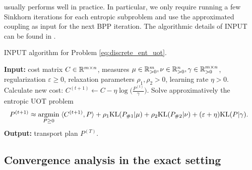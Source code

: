 usually performs well in practice. In particular,
we only require running a few Sinkhorn iterations for each entropic subproblem and
use the approximated coupling as input for the next BPP iteration.
The algorithmic details of INPUT can be found in .
\begin{algorithm}[t]
  \caption{INPUT algorithm for Problem \ref{eq:discrete_ent_uot}.}
  \label{alg:isppa}
\begin{algorithmic}[1]
  \STATE \textbf{Input:} cost matrix $C \in \mathbb R^{m \times n}$,
  measures $\mu \in \mathbb R^m_{> 0}, \nu \in \mathbb R^n_{> 0}, \gamma \in \mathbb R^{m \times n}_{> 0}$,
  regularization $\varepsilon \geq 0$, relaxation parameters $\rho_1, \rho_2 > 0$,
  learning rate $\eta > 0$.
  \STATE Calculate new cost: $C^{(t+1)} \gets C - \eta \log \Big( \frac{P^{(t)}}{\gamma} \Big)$.
  \STATE Solve approximatively the entropic UOT problem
  \begin{align*}
    P^{(t+1)} \approx \operatorname*{argmin}_{P \geq 0} \; \langle C^{(t+1)}, P \rangle +
    \rho_1 \text{KL}(P_{\# 1} | \mu) + \rho_2 \text{KL}(P_{\# 2} | \nu) + (\varepsilon + \eta) \text{KL}(P | \gamma).
  \end{align*}
  \ENDFOR
  \STATE \textbf{Output:} transport plan $P^{(T)}$.
\end{algorithmic}
\end{algorithm}

\subsection{Convergence analysis in the exact setting}

